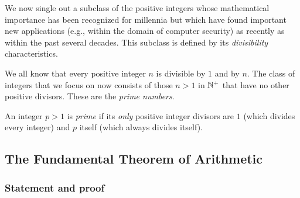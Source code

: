 We now single out a subclass of the positive integers whose mathematical importance has been recognized for millennia but which have found important new applications (e.g., within the domain of computer security) as recently as within the past several decades.  This subclass is defined by its {\em divisibility} characteristics.

\medskip

We all know that every positive integer $n$ is divisible by $1$ and by $n$.  The class of integers that we focus on now consists of those $n > 1$ in $\mathbb{N}^+$ that have no other positive divisors.  These are the {\it prime numbers}.

\smallskip

An integer $p >1$ is {\it prime} if its {\em only} positive integer divisors are $1$ (which divides
every integer) and $p$ itself (which always divides itself).

\bigskip

\noindent {}
  
\subsection{The Fundamental Theorem of Arithmetic}
\label{sec:Fund-Thm-Arith}

\subsubsection{Statement and proof}
\label{sec:FTA-basics}

   

